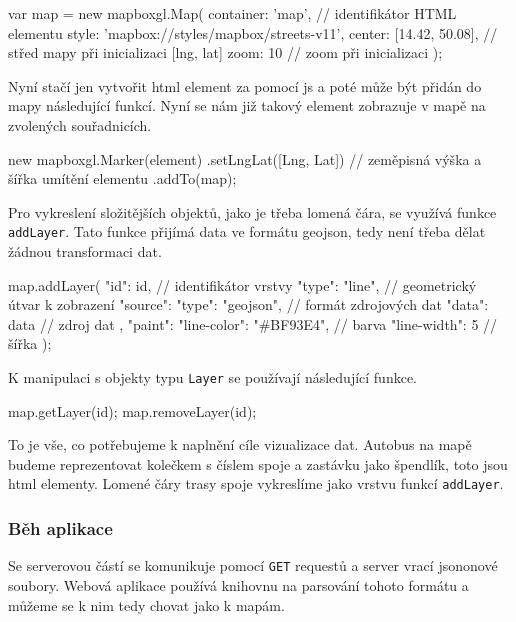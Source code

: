 \begin{code}[frame=none]
var map = new mapboxgl.Map({
  container: 'map', // identifikátor HTML elementu
  style: 'mapbox://styles/mapbox/streets-v11',
  center: [14.42, 50.08], // střed mapy při inicializaci [lng, lat]
    zoom: 10 // zoom při inicializaci
});
\end{code}


Nyní stačí jen vytvořit \gls{html} element za pomocí \gls{js} a poté může být přidán do mapy následující funkcí. Nyní se nám již takový element zobrazuje v mapě na zvolených souřadnicích.


\begin{code}[frame=none]
new mapboxgl.Marker(element)
  .setLngLat([Lng, Lat]) // zeměpisná výška a šířka
    umítění elementu
  .addTo(map);
\end{code}


Pro vykreslení složitějších objektů, jako je třeba lomená čára, se využívá funkce \verb-addLayer-. Tato funkce přijímá data ve formátu \gls{geojson}, tedy není třeba dělat žádnou transformaci dat.


\begin{code}[frame=none]
map.addLayer({
  "id": id, // identifikátor vrstvy
  "type": "line", // geometrický útvar k zobrazení
  "source": {
    "type": "geojson", // formát zdrojových dat
    "data": data // zdroj dat
  },
  "paint": {
    "line-color": "#BF93E4", // barva
    "line-width": 5 // šířka
  }
});
\end{code}


K manipulaci s objekty typu \verb-Layer- se používají následující funkce.


\begin{code}[frame=none]
map.getLayer(id);
map.removeLayer(id);
\end{code}


To je vše, co potřebujeme k naplnění cíle vizualizace dat. Autobus na mapě budeme reprezentovat kolečkem s číslem spoje a zastávku jako špendlík, toto jsou \gls{html} elementy. Lomené čáry trasy spoje vykreslíme jako vrstvu funkcí \verb-addLayer-.


\subsubsection{Běh aplikace}


Se serverovou částí se komunikuje pomocí \verb-GET- requestů a server vrací \gls{json}onové soubory. Webová aplikace používá knihovnu na parsování tohoto formátu a můžeme se k nim tedy chovat jako k mapám.


